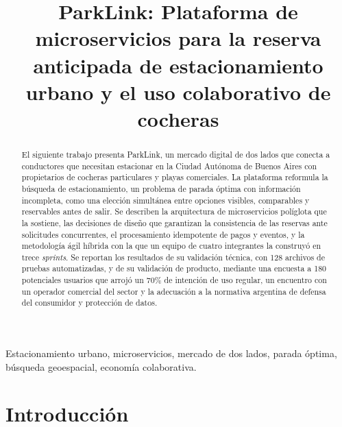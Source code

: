 \documentclass[conference,a4paper]{IEEEtran}
\begin{document}
\title{ParkLink: Plataforma de microservicios para la reserva anticipada de estacionamiento urbano y el uso colaborativo de cocheras}

\author{
}

\maketitle

\begin{abstract}
El siguiente trabajo presenta ParkLink, un mercado digital de dos lados que conecta a conductores que necesitan estacionar en la Ciudad Autónoma de Buenos Aires con propietarios de cocheras particulares y playas comerciales. La plataforma reformula la búsqueda de estacionamiento, un problema de parada óptima con información incompleta, como una elección simultánea entre opciones visibles, comparables y reservables antes de salir. Se describen la arquitectura de microservicios políglota que la sostiene, las decisiones de diseño que garantizan la consistencia de las reservas ante solicitudes concurrentes, el procesamiento idempotente de pagos y eventos, y la metodología ágil híbrida con la que un equipo de cuatro integrantes la construyó en trece \textit{sprints}. Se reportan los resultados de su validación técnica, con 128 archivos de pruebas automatizadas, y de su validación de producto, mediante una encuesta a 180 potenciales usuarios que arrojó un 70\% de intención de uso regular, un encuentro con un operador comercial del sector y la adecuación a la normativa argentina de defensa del consumidor y protección de datos.
\end{abstract}

\begin{IEEEkeywords}
Estacionamiento urbano, microservicios, mercado de dos lados, parada óptima, búsqueda geoespacial, economía colaborativa.
\end{IEEEkeywords}

\section{Introducción}\label{sec:intro}
\end{document}

